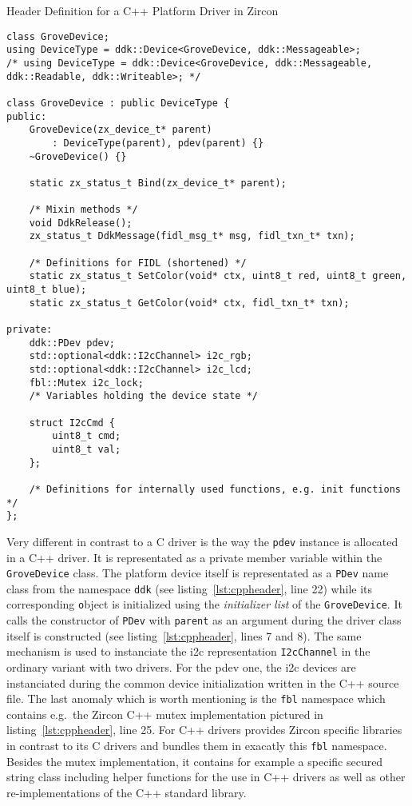 \begin{listing} [H]
    \caption{Header Definition for a C++ Platform Driver in Zircon}
\label{lst:cppheader}
\begin{verbatim}
class GroveDevice;
using DeviceType = ddk::Device<GroveDevice, ddk::Messageable>;
/* using DeviceType = ddk::Device<GroveDevice, ddk::Messageable, ddk::Readable, ddk::Writeable>; */

class GroveDevice : public DeviceType {
public:
    GroveDevice(zx_device_t* parent)
        : DeviceType(parent), pdev(parent) {}
    ~GroveDevice() {}

    static zx_status_t Bind(zx_device_t* parent);

    /* Mixin methods */
    void DdkRelease();
    zx_status_t DdkMessage(fidl_msg_t* msg, fidl_txn_t* txn);

    /* Definitions for FIDL (shortened) */
    static zx_status_t SetColor(void* ctx, uint8_t red, uint8_t green, uint8_t blue);
    static zx_status_t GetColor(void* ctx, fidl_txn_t* txn);

private:
    ddk::PDev pdev;
    std::optional<ddk::I2cChannel> i2c_rgb;
    std::optional<ddk::I2cChannel> i2c_lcd;
    fbl::Mutex i2c_lock;
    /* Variables holding the device state */

    struct I2cCmd {
        uint8_t cmd;
        uint8_t val;
    };

    /* Definitions for internally used functions, e.g. init functions */
};
\end{verbatim}
\end{listing}

Very different in contrast to a C driver is the way the \texttt{pdev} instance is allocated in a C++ driver.
It is representated as a private member variable within the \texttt{GroveDevice} class.
The platform device itself is representated as a \texttt{PDev} name class from the namespace \texttt{ddk} (see listing~\ref{lst:cppheader}, line 22) while its corresponding \texttt object is initialized using the \textit{initializer list} of the \texttt{GroveDevice}.
It calls the constructor of \texttt{PDev} with \texttt{parent} as an argument during the driver class itself is constructed (see listing~\ref{lst:cppheader}, lines 7 and 8).
The same mechanism is used to instanciate the \ac{i2c} representation \texttt{I2cChannel} in the ordinary variant with two drivers.
For the pdev one, the \ac{i2c} devices are instanciated during the common device initialization written in the C++ source file.
The last anomaly which is worth mentioning is the \texttt{fbl} namespace which contains e.g.\ the Zircon C++ mutex implementation pictured in listing~\ref{lst:cppheader}, line 25.
For C++ drivers provides Zircon specific libraries in contrast to its C drivers and bundles them in exacatly this \texttt{fbl} namespace.
Besides the mutex implementation, it contains for example a specific secured string class including helper functions for the use in C++ drivers as well as other re-implementations of the C++ standard library.

